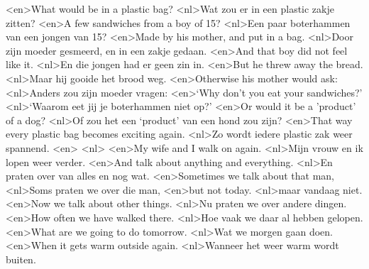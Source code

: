<en>What would be in a plastic bag?
<nl>Wat zou er in een plastic zakje zitten?
<en>A few sandwiches from a boy of 15?
<nl>Een paar boterhammen van een jongen van 15?
<en>Made by his mother, and put in a bag.
<nl>Door zijn moeder gesmeerd, en in een zakje gedaan.
<en>And that boy did not feel like it.
<nl>En die jongen had er geen zin in.
<en>But he threw away the bread.
<nl>Maar hij gooide het brood weg.
<en>Otherwise his mother would ask:
<nl>Anders zou zijn moeder vragen:
<en>`Why don't you eat your sandwiches?'
<nl>`Waarom eet jij je boterhammen niet op?'
<en>Or  would it  be a 'product' of a dog?
<nl>Of zou het een `product' van een hond zou zijn?
<en>That way every plastic bag becomes exciting again.
<nl>Zo wordt iedere plastic zak weer spannend.
<en>
<nl>
<en>My wife and I walk on again.
<nl>Mijn vrouw en ik lopen weer verder.
<en>And talk about anything and everything.
<nl>En praten over van alles en nog wat.
<en>Sometimes we talk about that man,
<nl>Soms praten we over die man,
<en>but not today.
<nl>maar vandaag niet.
<en>Now we talk about other things.
<nl>Nu praten we over andere dingen.
<en>How often we have walked there.
<nl>Hoe vaak we daar al hebben gelopen.
<en>What are we going to do tomorrow.
<nl>Wat we morgen gaan doen.
<en>When it  gets warm outside again.
<nl>Wanneer het weer warm wordt buiten.

